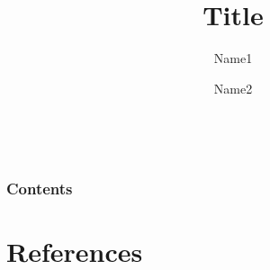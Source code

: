 \documentclass[10pt]{beamer}
\begin{document}
\title[January 2026]{Title}
\author[University of Trento]{Name1 \and Name2}


\date[]{\MonthName\ \number\year}

\frame{\titlepage}
\begin{frame}
\frametitle{Contents}
\tableofcontents
\end{frame}



\section*{References}  
\begin{frame}
\nocite{*}
 
\small{}
\end{frame}
\end{document}
